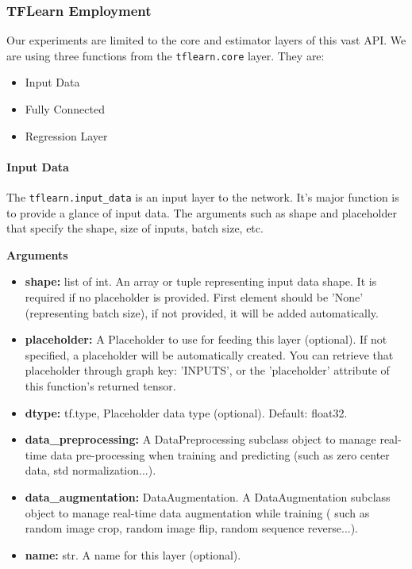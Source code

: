 \documentclass[conference,compsoc]{IEEEtran}
\begin{document}
\subsubsection{TFLearn Employment}

Our experiments are limited to the core and estimator layers of this vast API. We are using three functions from the \texttt{tflearn.core} layer. They are:

\begin{itemize}
    \item Input Data
    \item Fully Connected
    \item Regression Layer
\end{itemize}

\paragraph{Input Data}

The \texttt{tflearn.input\_data} is an input layer to the network. It’s major function is to provide a glance of input data. The arguments such as shape and placeholder that specify the shape, size of inputs, batch size, etc.

\textbf{Arguments}

\begin{itemize}
    \item \textbf{shape:} list of int. An array or tuple representing input data shape. It is required if no placeholder is provided. First element should be 'None' (representing batch size), if not provided, it will be added automatically.
    \item \textbf{placeholder:} A Placeholder to use for feeding this layer (optional). If not specified, a placeholder will be automatically created. You can retrieve that placeholder through graph key: 'INPUTS', or the 'placeholder' attribute of this function's returned tensor.
    \item \textbf{dtype:} tf.type, Placeholder data type (optional). Default: float32.
    \item \textbf{data\_preprocessing:} A DataPreprocessing subclass object to manage real-time data pre-processing when training and predicting (such as zero center data, std normalization...).
    \item \textbf{data\_augmentation:} DataAugmentation. A DataAugmentation subclass object to manage real-time data augmentation while training ( such as random image crop, random image flip, random sequence reverse...).
    \item \textbf{name:} str. A name for this layer (optional).
\end{itemize}
\end{document}
